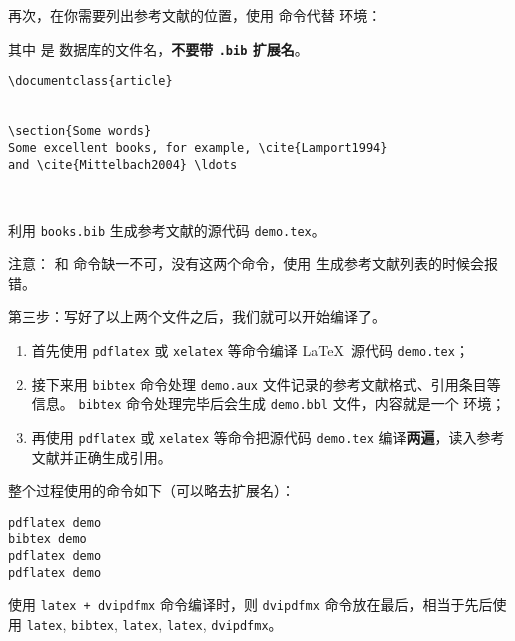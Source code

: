 再次，在你需要列出参考文献的位置，使用  命令代替  环境：
\begin{command}
\end{command}

其中  是  数据库的文件名，\textbf{不要带 \texttt{.bib} 扩展名}。

\begin{sourcecode}[htp]
\begin{Verbatim}
\documentclass{article}


\section{Some words}
Some excellent books, for example, \cite{Lamport1994} 
and \cite{Mittelbach2004} \ldots



\end{Verbatim}
\caption{利用 \texttt{books.bib} 生成参考文献的源代码 \texttt{demo.tex}。}
\end{sourcecode}

注意： 和  命令缺一不可，没有这两个命令，使用  生成参考文献列表的时候会报错。

第三步：写好了以上两个文件之后，我们就可以开始编译了。
\begin{enumerate}
  \item 首先使用 \texttt{pdflatex} 或 \texttt{xelatex} 等命令编译 \LaTeX\ 源代码 \texttt{demo.tex}；
  \item 接下来用 \texttt{bibtex} 命令处理 \texttt{demo.aux} 文件记录的参考文献格式、引用条目等信息。
  \texttt{bibtex} 命令处理完毕后会生成 \texttt{demo.bbl} 文件，内容就是一个  环境；
  \item 再使用 \texttt{pdflatex} 或 \texttt{xelatex} 等命令把源代码 \texttt{demo.tex} 编译\textbf{两遍}，读入参考文献并正确生成引用。
\end{enumerate}

整个过程使用的命令如下（可以略去扩展名）：
\begin{verbatim}
pdflatex demo
bibtex demo
pdflatex demo
pdflatex demo
\end{verbatim}

使用 \texttt{latex + dvipdfmx} 命令编译时，则 \texttt{dvipdfmx} 命令放在最后，相当于先后使用
\texttt{latex}, \texttt{bibtex}, \texttt{latex}, \texttt{latex}, \texttt{dvipdfmx}。

